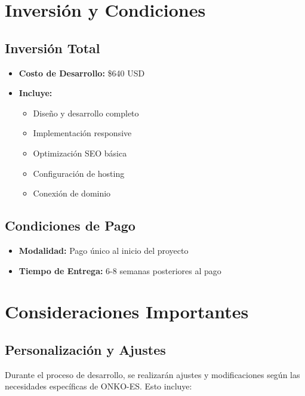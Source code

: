 \documentclass[12pt,a4paper]{article}
\begin{document}
\section{Inversión y Condiciones}

\subsection{Inversión Total}
\begin{itemize}
    \item \textbf{Costo de Desarrollo:} \$640 USD
    \item \textbf{Incluye:}
    \begin{itemize}
        \item Diseño y desarrollo completo
        \item Implementación responsive
        \item Optimización SEO básica
        \item Configuración de hosting
        \item Conexión de dominio
    \end{itemize}
\end{itemize}

\subsection{Condiciones de Pago}
\begin{itemize}
    \item \textbf{Modalidad:} Pago único al inicio del proyecto
    \item \textbf{Tiempo de Entrega:} 6-8 semanas posteriores al pago
\end{itemize}

\section{Consideraciones Importantes}

\subsection{Personalización y Ajustes}
Durante el proceso de desarrollo, se realizarán ajustes y modificaciones según las necesidades específicas de ONKO-ES. Esto incluye:
\end{document}
